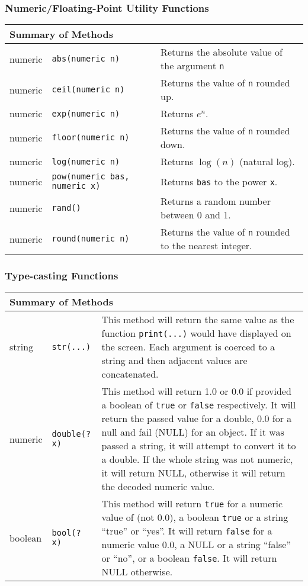 \subsubsection{Numeric/Floating-Point Utility Functions}

\begin{tabular}{|p{1.0in}|p{2.0in}||p{3in}|}
  \hline
  \multicolumn{3}{|l|}{\textbf{Summary of Methods}}\\
  \hline
  numeric & {\tt abs(numeric n)} & Returns the absolute value of the argument {\tt n} \\
  numeric & {\tt ceil(numeric n)} & Returns the value of {\tt n} rounded up.\\
  numeric & {\tt exp(numeric n)} & Returns $e^{n}$.\\
  numeric & {\tt floor(numeric n)} & Returns the value of {\tt n} rounded down.\\
  numeric & {\tt log(numeric n)} & Returns $\log(n)$ (natural log).\\
  numeric & {\tt pow(numeric bas, numeric x)} & Returns {\tt bas} to the power {\tt x}.\\
  numeric & {\tt rand()} & Returns a random number between 0 and 1.\\
  numeric & {\tt round(numeric n)} & Returns the value of {\tt n} rounded to the nearest integer.\\
  \hline
\end{tabular}

\subsubsection{Type-casting Functions}

\begin{tabular}{|p{1.0in}|p{2.0in}||p{3in}|}
  \hline
  \multicolumn{3}{|l|}{\textbf{Summary of Methods}}\\
  \hline
  string & {\tt str(...)} & This method will return the same value as the function {\tt print(...)}
  would have displayed on the screen. Each argument is coerced to a string and then adjacent
  values are concatenated.\\
  numeric & {\tt double(? x)} & This method will return 1.0 or 0.0 if provided a boolean of 
  {\tt true} or {\tt false} respectively. It will return the passed value for a double,
  0.0 for a null and fail (NULL) for an object. If it was passed a string, it will attempt
  to convert it to a double. If the whole string was not numeric, it will return NULL, otherwise
  it will return the decoded numeric value.\\
  boolean & {\tt bool(? x)} & This method will return {\tt true} for a numeric value of (not 0.0), a
  boolean {\tt true} or a string ``true'' or ``yes''. It will return {\tt false} for a numeric
  value 0.0, a NULL or a string ``false'' or ``no'', or a boolean {\tt false}. It will
  return NULL otherwise.\\
  \hline
\end{tabular}

